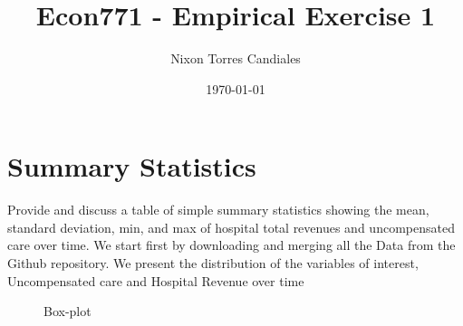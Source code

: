 \documentclass[
  12pt,
]{article}
\title{Econ771 - Empirical Exercise 1}
\author{Nixon Torres Candiales}
\date{\today}
\begin{document}
\maketitle

\hypertarget{summary-statistics}{%
\section{Summary Statistics}\label{summary-statistics}}

Provide and discuss a table of simple summary statistics showing the
mean, standard deviation, min, and max of hospital total revenues and
uncompensated care over time. We start first by downloading and merging
all the Data from the Github repository. We present the distribution of
the variables of interest, Uncompensated care and Hospital Revenue over
time

\begin{figure}
\caption{Box-plot}\label{fig:Fig-1}
\end{figure}
\end{document}

